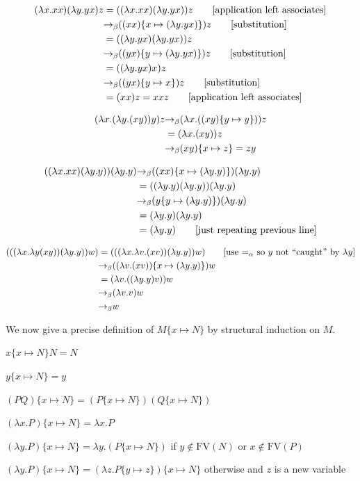 \begin{frame}
\begin{align*}
(\lambda x.xx)(\lambda y.yx)z & = ((\lambda x.xx)(\lambda y.yx))z
\tag*{[application left associates]} \\
&{\rightarrow_\beta} ((xx)\{x\mapsto (\lambda y.yx)\})z 
\tag*{[substitution]} \\
&= ((\lambda y.yx)(\lambda y.yx))z \\
&{\rightarrow_\beta} ((yx)\{y\mapsto (\lambda y.yx)\})z
\tag*{[substitution]} \\
&= ((\lambda y.yx)x)z \\
&{\rightarrow_\beta} ((yx)\{y\mapsto x\})z
\tag*{[substitution]} \\
&= (xx)z = xxz
\tag*{[application left associates]}
\end{align*}

\begin{align*}
(\lambda x.(\lambda y.(xy))y)z
&{\rightarrow_\beta} (\lambda x.((xy)\{y\mapsto y\}))z \\
&= (\lambda x.(xy))z \\
&{\rightarrow_\beta} (xy)\{x\mapsto z\}=zy
\end{align*}
\end{frame}

\begin{frame}
\begin{align*}
((\lambda x.xx)(\lambda y.y))(\lambda y.y)
&{\rightarrow_\beta} ((xx)\{x\mapsto (\lambda y.y)\})(\lambda y.y) \\
&=((\lambda y.y)(\lambda y.y))(\lambda y.y) \\
&{\rightarrow_\beta} (y\{y\mapsto(\lambda y.y)\})(\lambda y.y) \\
&=(\lambda y.y)(\lambda y.y) \\
&=(\lambda y.y)
\tag*{[just repeating previous line]}
\end{align*}

\begin{align*}
(((\lambda x.\lambda y(xy))(\lambda y.y))w)
&= (((\lambda x.\lambda v.(xv))(\lambda y.y))w)
\tag*{[use $=_\alpha$ so $y$ not ``caught'' by $\lambda y$]} \\
&{\rightarrow_\beta} ((\lambda v.(xv))\{x\mapsto(\lambda y.y)\})w \\
&= (\lambda v.((\lambda y.y)v))w \\
&{\rightarrow_\beta} (\lambda v.v)w \\
&{\rightarrow_\beta} w
\end{align*}
\end{frame}

\begin{frame}
We now give a precise definition of  $M\{x\mapsto N\}$
by structural induction on $M$.

$x\{x\mapsto N\}N=N$

$y\{x\mapsto N\}=y$

$(PQ)\{x\mapsto N\}=(P\{x\mapsto N\})(Q\{x\mapsto N\})$

$(\lambda x.P)\{x\mapsto N\}=\lambda x.P$

$(\lambda y.P)\{x\mapsto N\}=\lambda y.(P\{x\mapsto N\})$ if
$y\notin\text{FV}(N)$ or $x\notin\text{FV}(P)$

$(\lambda y.P)\{x\mapsto N\}=(\lambda z.P\{y\mapsto z\})\{x\mapsto
N\}$ otherwise and $z$ is a new variable
\end{frame}

